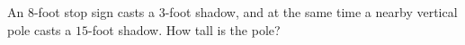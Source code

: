 An $8$-foot stop sign casts a $3$-foot shadow, and at the same time a nearby vertical pole casts a $15$-foot shadow. How tall is the pole?
